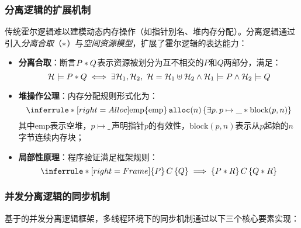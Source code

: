 \subsubsection{分离逻辑的扩展机制}
传统霍尔逻辑难以建模动态内存操作（如指针别名、堆内存分配）。分离逻辑通过引入\emph{分离合取}（$\ast$）与\emph{空间资源模型}，扩展了霍尔逻辑的表达能力：
\begin{itemize}
    \item \textbf{分离合取}：断言$P \ast Q$表示资源被划分为互不相交的$P$和$Q$两部分，满足：
    \begin{equation}
        \mathcal{H} \models P \ast Q \iff \exists \mathcal{H}_1, \mathcal{H}_2,\ \mathcal{H} = \mathcal{H}_1 \uplus \mathcal{H}_2 \land \mathcal{H}_1 \models P \land \mathcal{H}_2 \models Q
    \end{equation}
    
    \item \textbf{堆操作公理}：内存分配规则形式化为：
    \begin{equation}
        \inferrule*[right=Alloc]{
            \mathrm{emp}
        }{
            \hoare{\mathrm{emp}}{\mathtt{alloc}(n)}{\exists p.\, p \mapsto \_ \ast \mathrm{block}(p, n)}
        }
        \end{equation}
    其中$\mathrm{emp}$表示空堆，$p \mapsto \_\,$声明指针$p$的有效性，$\mathrm{block}(p, n)$表示从$p$起始的$n$字节连续内存块；
    
    \item \textbf{局部性原理}：程序验证满足框架规则：
    \begin{equation}
        \inferrule*[right=Frame]{}{\hoare{P}{C}{Q} \implies \hoare{P \sepcon R}{C}{Q \sepcon R}}
    \end{equation}
\end{itemize}

\subsubsection{并发分离逻辑的同步机制}
\label{subsubsec:concurrent-logic}

基于\cite{brookes2007concurrent}的并发分离逻辑框架，多线程环境下的同步机制通过以下三个核心要素实现：

